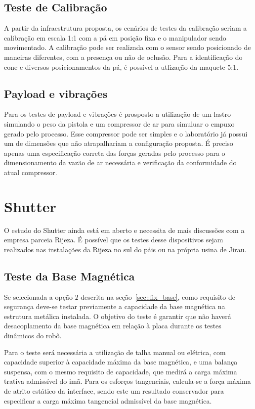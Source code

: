 \subsection{Teste de Calibração}

A partir da infraestrutura proposta, os cenários de testes da calibração seriam
a calibração em escala 1:1 com a pá em posição fixa e o manipulador sendo
movimentado. A calibração pode ser realizada com o sensor sendo posicionado de
maneiras diferentes, com a presença ou não de oclusão. Para a identificação do
cone e diversos posicionamentos da pá, é possível a utlização da maquete 5:1.

\subsection{Payload e vibrações}

Para os testes de payload e vibrações é prosposto a utilização de um lastro
simulando o peso da pistola e um compressor de ar para simuluar o empuxo gerado
pelo processo. Esse compressor pode ser simples e o laboratório já possui um de
dimensões que não atrapalhariam a configuração proposta. É preciso apenas uma
especificação correta das forças geradas pelo processo para o dimensionamento da
vazão de ar necessária e verificação da conformidade do atual compressor.

\section{Shutter}

O estudo do Shutter ainda está em aberto e necessita de mais discussões com a
empresa parceia Rijeza. É possível que os testes desse dispositivos sejam
realizados nas instalações da Rijeza no sul do páis ou na própria usina de
Jirau.

\subsection{Teste da Base Magnética}
 
 Se selecionada a opção $2$ descrita na seção~\ref{sec::fix_base}, como
 requisito de segurança deve-se testar previamente a capacidade da base
 magnética na estrutura metálica instalada.
 O objetivo do teste é garantir que não haverá desacoplamento da base magnética
 em relação à placa durante os testes dinâmicos do robô.
 
 Para o teste será necessária a utilização de talha manual ou elétrica, com
 capacidade superior à capacidade máxima da base magnética, e uma balança
 suspensa, com o mesmo requisito de capacidade, que medirá a carga máxima
 trativa admissível do imã. 
 Para os esforços tangenciais, calcula-se a força máxima de atrito estático da
 interface, sendo este um resultado conservador para especificar a carga máxima
 tangencial admissível da base magnética.

